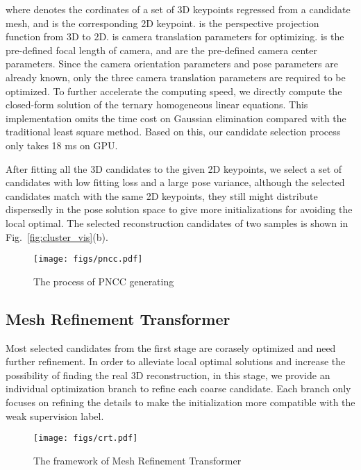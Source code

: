 \documentclass[sigconf]{acmart}
\begin{document}
where  denotes the cordinates of a set of 3D keypoints regressed from a candidate mesh, 
and  is the corresponding 2D keypoint.  is the 
perspective projection function from 3D to 2D.  is camera translation parameters for optimizing. 
 is the pre-defined focal length of camera,  and  are the pre-defined camera center 
parameters. 
Since the camera orientation parameters and pose parameters are already known, only the three camera translation parameters are required to be optimized. 
To further accelerate the computing speed, we directly compute the closed-form solution of the ternary homogeneous linear equations. This 
implementation omits the time cost on Gaussian elimination compared with the traditional least square method. Based on this, our candidate 
selection process only takes 18 ms on GPU. 

After fitting all the 3D candidates to the given 2D keypoints, 
we select a set of candidates with low fitting loss and a large pose variance, although the 
selected candidates match with the same 2D keypoints, they still might distribute dispersedly 
in the pose solution space to give more initializations for avoiding the local optimal. The selected 
reconstruction candidates of two samples is shown in Fig.~\ref{fig:cluster_vis}(b). 

\begin{figure}[t]
	\begin{center}
\texttt{[image: figs/pncc.pdf]}
	\end{center}
	\caption{The process of PNCC generating}
	\label{fig:pncc}
\end{figure}

\subsection{Mesh Refinement Transformer}
Most selected candidates from the first stage are corasely optimized and need further refinement. 
In order to alleviate local optimal solutions and increase the possibility of finding the real 
3D reconstruction, in this stage, we provide an individual optimization branch to refine each coarse candidate. 
Each branch only focuses on refining the details to 
make the initialization more compatible with the weak supervision label.

\begin{figure*}
	\begin{center}
		\texttt{[image: figs/crt.pdf]}
	\end{center}
	\caption{The framework of Mesh Refinement Transformer}
	\label{fig:crt}
\end{figure*}
\end{document}
